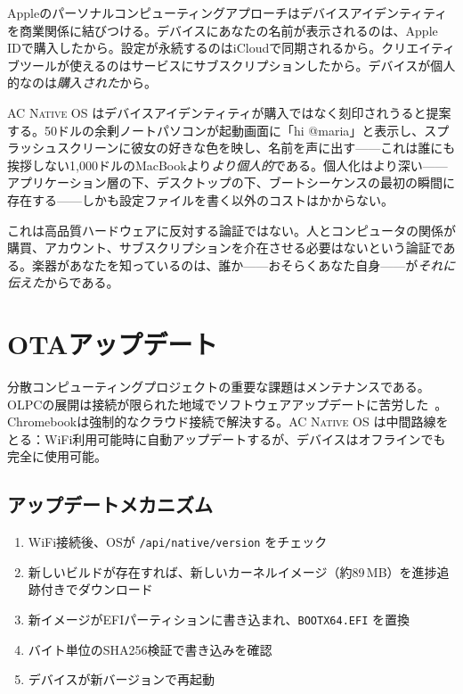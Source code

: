 \documentclass[10pt,letterpaper,twocolumn]{article}
\newcommand{\acos}{\textsc{AC Native OS}}
\begin{document}
Appleのパーソナルコンピューティングアプローチはデバイスアイデンティティを商業関係に結びつける。デバイスにあなたの名前が表示されるのは、Apple IDで購入したから。設定が永続するのはiCloudで同期されるから。クリエイティブツールが使えるのはサービスにサブスクリプションしたから。デバイスが個人的なのは\emph{購入された}から。

\acos{} はデバイスアイデンティティが購入ではなく刻印されうると提案する。50ドルの余剰ノートパソコンが起動画面に「hi @maria」と表示し、スプラッシュスクリーンに彼女の好きな色を映し、名前を声に出す——これは誰にも挨拶しない1,000ドルのMacBookより\emph{より個人的}である。個人化はより深い——アプリケーション層の下、デスクトップの下、ブートシーケンスの最初の瞬間に存在する——しかも設定ファイルを書く以外のコストはかからない。

これは高品質ハードウェアに反対する論証ではない。人とコンピュータの関係が購買、アカウント、サブスクリプションを介在させる必要はないという論証である。楽器があなたを知っているのは、誰か——おそらくあなた自身——が\emph{それに伝えた}からである。


\section{OTAアップデート}
\label{sec:ota}

分散コンピューティングプロジェクトの重要な課題はメンテナンスである。OLPCの展開は接続が限られた地域でソフトウェアアップデートに苦労した~\citep{warschauer2004technology}。Chromebookは強制的なクラウド接続で解決する。\acos{} は中間路線をとる：WiFi利用可能時に自動アップデートするが、デバイスはオフラインでも完全に使用可能。

\subsection{アップデートメカニズム}

\begin{enumerate}
  \item WiFi接続後、OSが \texttt{/api/native/version} をチェック
  \item 新しいビルドが存在すれば、新しいカーネルイメージ（約89\,MB）を進捗追跡付きでダウンロード
  \item 新イメージがEFIパーティションに書き込まれ、\texttt{BOOTX64.EFI} を置換
  \item バイト単位のSHA256検証で書き込みを確認
  \item デバイスが新バージョンで再起動
\end{enumerate}
\end{document}
